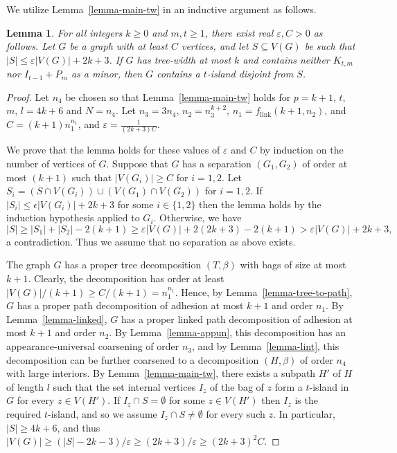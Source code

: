 \documentclass[12pt]{article}
\newtheorem{lemma}[theorem]{Lemma}
\newcommand{\eps}{\varepsilon}
\begin{document}
We utilize Lemma~\ref{lemma-main-tw} in an inductive argument as follows.

\begin{lemma}\label{lemma-comb}
For all integers $k\ge 0$ and $m,t\ge 1$, there exist real $\eps,C >0$  as follows.  Let $G$ be a graph with at least $C$
vertices, and let $S\subseteq V(G)$ be such that $|S| \leq  \eps|V(G)|+2k+3$.  If $G$ has tree-width at most $k$ and contains neither $K_{t,m}$ nor $I_{t-1}+P_m$ as a minor,
then $G$ contains a $t$-island disjoint from $S$.
\end{lemma}
\begin{proof}
Let $n_4$ be chosen so that Lemma~\ref{lemma-main-tw} holds for $p=k+1$, $t$, $m$, $l=4k+6$ and $N=n_4$.
Let $n_3=3n_4$, $n_2=n_3^{k+2}$, $n_1=f_{\text{link}}(k+1,n_2)$, and $C=(k+1)n_1^{n_1}$, and $\eps=\frac{1}{(2k+3)C}$. 
 
We prove that the lemma holds for these values of $\eps$ and $C$ by induction on the number of vertices of $G$.
Suppose that $G$ has a separation $(G_1,G_2)$ of order at most $(k+1)$ such that $|V(G_i)| \geq C$ for $i=1,2$.
Let $S_i = (S  \cap V(G_i)) \cup (V(G_1) \cap V(G_2))$ for $i=1,2$. If $|S_i| \leq \epsilon|V(G_i)|+2k+3$ for
some $i \in \{1,2\}$ then the lemma holds by the induction hypothesis applied to $G_i$. Otherwise, we have
$$|S| \geq |S_1|+|S_2| - 2(k+1) \geq \eps|V(G)|+2(2k+3)-2(k+1) >  \eps|V(G)|+2k+3,$$
a contradiction.
Thus we assume that no separation as above exists.

The graph $G$ has a proper tree decomposition $(T,\beta)$ with bags of size at most $k+1$.  Clearly, the decomposition has
order at least $|V(G)|/(k+1)\ge C/(k+1)=n_1^{n_1}$.  Hence, by Lemma~\ref{lemma-tree-to-path}, $G$ has a proper path decomposition of adhesion
at most $k+1$ and order $n_1$.  By Lemma~\ref{lemma-linked}, $G$ has a proper linked path decomposition of adhesion at most $k+1$
and order $n_2$.  By Lemma~\ref{lemma-appun}, this decomposition has an appearance-universal coarsening of order $n_3$,
and by Lemma~\ref{lemma-lint}, this decomposition can be further coarsened to a decomposition $(H,\beta)$ of order $n_4$ with large interiors.
By Lemma~\ref{lemma-main-tw}, there exists a subpath $H'$ of $H$  of length $l$ such that the set internal vertices $I_z$ of the bag of $z$ form a $t$-island in $G$ for every $z \in V(H')$.  If 
$I_z \cap S = \emptyset$ for some $z \in V(H')$ then $I_z$ is the required $t$-island, and so we assume  $I_z \cap S \neq \emptyset$ for every such $z$.
In particular, $|S|\ge 4k+6$, and thus $|V(G)|\ge (|S|-2k-3)/\eps\ge (2k+3)/\eps\ge(2k+3)^2C$.


\end{proof}
\end{document}
